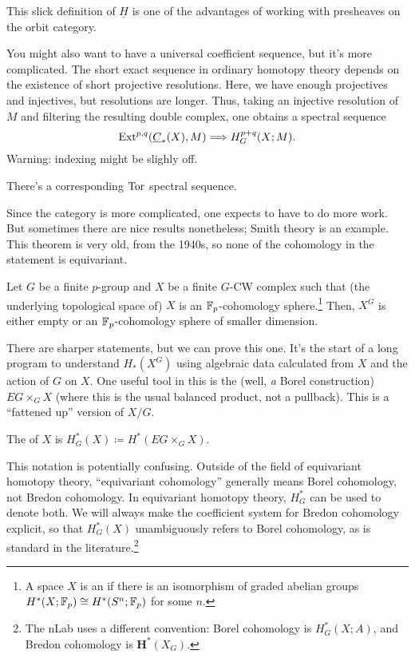 This slick definition of $\underline H$ is one of the advantages of working with presheaves on the orbit category.
\begin{rem}
You might also want to have a universal coefficient sequence, but it's more complicated. The short exact sequence
in ordinary homotopy theory depends on the existence of short projective resolutions. Here, we have enough
projectives and injectives, but resolutions are longer. Thus, taking an injective resolution of $M$ and filtering
the resulting double complex, one obtains a spectral sequence
\[\operatorname{Ext}^{p,q}(\underline C_*(X), M)\Longrightarrow H_G^{p+q}(X;M).\]
{\color{red}Warning}: indexing might be slighly off.

There's a corresponding $\operatorname{Tor}$ spectral sequence.
\end{rem}
Since the category is more complicated, one expects to have to do more work. But sometimes there are nice results
nonetheless; Smith theory is an example. This theorem is very old, from the 1940s, so none of the cohomology in the
statement is equivariant.
\begin{thm}[Smith]
\label{smith}
Let $G$ be a finite $p$-group and $X$ be a finite $G$-CW complex such that (the underlying topological space of)
$X$ is an $\mathbb F_p$-cohomology sphere.\footnote{A space $X$ is an  if there is an
isomorphism of graded abelian groups $H^*(X;\mathbb F_p)\cong H^*(S^n;\mathbb F_p)$ for some $n$.} Then, $X^G$ is either empty or
an $\mathbb F_p$-cohomology sphere of smaller dimension.
\end{thm}
There are sharper statements, but we can prove this one. It's the start of a long program to understand $H_*(X^G)$
using algebraic data calculated from $X$ and the action of $G$ on $X$. One useful tool in this is the  (well, \emph a Borel construction) $EG\times_G X$ (where this is the usual balanced product, not a
pullback). This is a ``fattened up'' version of $X/G$.
\begin{defn}
The  of $X$ is $H_G^*(X) \coloneqq H^*(EG\times_G X)$.
\end{defn}
\begin{warn}
This notation is potentially confusing. Outside of the field of equivariant homotopy theory, ``equivariant
cohomology'' generally means Borel cohomology, not Bredon cohomology. In equivariant homotopy theory, $H_G^*$ can
be used to denote both. We will always make the coefficient system for Bredon cohomology explicit, so that
$H_G^*(X)$ unambiguously refers to Borel cohomology, as is standard in the literature.\footnote{The nLab uses a
different convention: Borel cohomology is $H_G^*(X;A)$, and Bredon cohomology is $\mathbf H^*(X_G)$.}
\end{warn}
